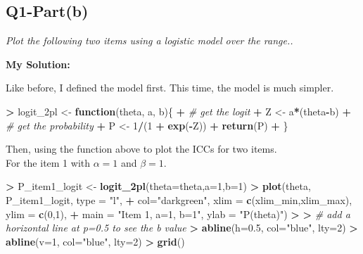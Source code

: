 \documentclass[
]{article}
\newenvironment{Shaded}{\begin{snugshade}}{\end{snugshade}}
\newcommand{\AttributeTok}[1]{\textcolor[rgb]{0.13,0.29,0.53}{#1}}
\newcommand{\CommentTok}[1]{\textcolor[rgb]{0.56,0.35,0.01}{\textit{#1}}}
\newcommand{\ControlFlowTok}[1]{\textcolor[rgb]{0.13,0.29,0.53}{\textbf{#1}}}
\newcommand{\DecValTok}[1]{\textcolor[rgb]{0.00,0.00,0.81}{#1}}
\newcommand{\ErrorTok}[1]{\textcolor[rgb]{0.64,0.00,0.00}{\textbf{#1}}}
\newcommand{\FloatTok}[1]{\textcolor[rgb]{0.00,0.00,0.81}{#1}}
\newcommand{\FunctionTok}[1]{\textcolor[rgb]{0.13,0.29,0.53}{\textbf{#1}}}
\newcommand{\NormalTok}[1]{#1}
\newcommand{\OtherTok}[1]{\textcolor[rgb]{0.56,0.35,0.01}{#1}}
\newcommand{\SpecialCharTok}[1]{\textcolor[rgb]{0.81,0.36,0.00}{\textbf{#1}}}
\newcommand{\StringTok}[1]{\textcolor[rgb]{0.31,0.60,0.02}{#1}}
\begin{document}
\hypertarget{q1-partb}{%
\subsection{Q1-Part(b)}\label{q1-partb}}

\emph{Plot the following two items using a logistic model over the
range..}

\textbf{My Solution: }

Like before, I defined the model first. This time, the model is much
simpler.

\begin{Shaded}
\begin{Highlighting}[]
\SpecialCharTok{\textgreater{}}\NormalTok{ logit\_2pl }\OtherTok{\textless{}{-}} \ControlFlowTok{function}\NormalTok{(theta, a, b)\{}
\SpecialCharTok{+}   \CommentTok{\# get the logit}
\SpecialCharTok{+}\NormalTok{   Z }\OtherTok{\textless{}{-}}\NormalTok{ a}\SpecialCharTok{*}\NormalTok{(theta}\SpecialCharTok{{-}}\NormalTok{b)}
\SpecialCharTok{+}   \CommentTok{\# get the probability}
\SpecialCharTok{+}\NormalTok{   P }\OtherTok{\textless{}{-}} \DecValTok{1}\SpecialCharTok{/}\NormalTok{(}\DecValTok{1} \SpecialCharTok{+} \FunctionTok{exp}\NormalTok{(}\SpecialCharTok{{-}}\NormalTok{Z))}
\SpecialCharTok{+}   \FunctionTok{return}\NormalTok{(P)}
\SpecialCharTok{+}\NormalTok{ \}}
\end{Highlighting}
\end{Shaded}

Then, using the function above to plot the ICCs for two items.\\
For the item 1 with \(\alpha=1\) and \(\beta =1\).

\begin{Shaded}
\begin{Highlighting}[]
\SpecialCharTok{\textgreater{}}\NormalTok{ P\_item1\_logit }\OtherTok{\textless{}{-}} \FunctionTok{logit\_2pl}\NormalTok{(}\AttributeTok{theta=}\NormalTok{theta,}\AttributeTok{a=}\DecValTok{1}\NormalTok{,}\AttributeTok{b=}\DecValTok{1}\NormalTok{)}
\SpecialCharTok{\textgreater{}} \FunctionTok{plot}\NormalTok{(theta, P\_item1\_logit, }\AttributeTok{type =} \StringTok{"l"}\NormalTok{, }
\SpecialCharTok{+}      \AttributeTok{col=}\StringTok{"darkgreen"}\NormalTok{,  }\AttributeTok{xlim =} \FunctionTok{c}\NormalTok{(xlim\_min,xlim\_max), }\AttributeTok{ylim =} \FunctionTok{c}\NormalTok{(}\DecValTok{0}\NormalTok{,}\DecValTok{1}\NormalTok{),}
\SpecialCharTok{+}      \AttributeTok{main =} \StringTok{"Item 1, a=1, b=1"}\NormalTok{, }\AttributeTok{ylab =} \StringTok{"P(theta)"}\NormalTok{)}
\SpecialCharTok{\textgreater{}} 
\ErrorTok{\textgreater{}} \CommentTok{\# add a horizontal line at p=0.5 to see the b value}
\ErrorTok{\textgreater{}} \FunctionTok{abline}\NormalTok{(}\AttributeTok{h=}\FloatTok{0.5}\NormalTok{, }\AttributeTok{col=}\StringTok{"blue"}\NormalTok{, }\AttributeTok{lty=}\DecValTok{2}\NormalTok{)}
\SpecialCharTok{\textgreater{}} \FunctionTok{abline}\NormalTok{(}\AttributeTok{v=}\DecValTok{1}\NormalTok{, }\AttributeTok{col=}\StringTok{"blue"}\NormalTok{, }\AttributeTok{lty=}\DecValTok{2}\NormalTok{)}
\SpecialCharTok{\textgreater{}} \FunctionTok{grid}\NormalTok{()}
\end{Highlighting}
\end{Shaded}
\end{document}
